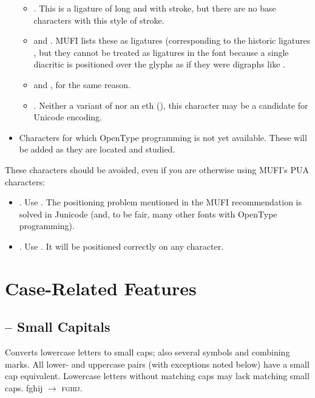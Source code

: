 \begin{itemize}
\begin{itemize}
\item {} . This is a ligature of long  and  with stroke,
but there are no base characters with this style of stroke.
\item {}  and . MUFI lists these as ligatures (corresponding to the
historic ligatures , but they cannot be treated as ligatures in the
font because a single diacritic is positioned over the glyphs as if they were digraphs like
.
\item {}  and , for the same reason.
\item {}  . Neither a variant of
 nor an eth (), this character may be a candidate for Unicode
encoding.
\end{itemize}
\item Characters for which OpenType programming is not yet available. These will be added as they are located and
studied.%
\end{itemize}
These characters should be avoided, even if you are otherwise using MUFI’s PUA characters:

\liststyleLii
\begin{itemize}
\item {} . Use  . The
positioning problem mentioned in the MUFI recommendation is solved in Junicode (and, to be fair, many other fonts with
OpenType programming).
\item {} . Use  . It
will be positioned correctly on any character.
\end{itemize}

\section{Case-Related Features}
\subsection{ – Small Capitals}
Converts lowercase letters to small caps; also several symbols and combining marks. All lower- and uppercase pairs (with
exceptions noted below) have a small cap equivalent. Lowercase letters without matching caps may lack matching small
caps. fghij $\rightarrow $ \textsc{fghij}.

